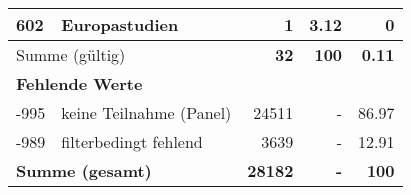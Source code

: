 \begin{longtable}{lXrrr}
     602 &
     \multicolumn{1}{X}{ Europastudien   } &


       \num{1} &
       \num[round-mode=places,round-precision=2]{3.12} &
         \num[round-mode=places,round-precision=2]{0} \\
     \midrule
     \multicolumn{2}{l}{Summe (gültig)} &
       \textbf{\num{32}} &
     \textbf{100} &
       \textbf{\num[round-mode=places,round-precision=2]{0.11}} \\
     \multicolumn{5}{l}{\textbf{Fehlende Werte}}\\
       -995 &
       keine Teilnahme (Panel) &
         \num{24511} &
        - &
         \num[round-mode=places,round-precision=2]{86.97} \\
       -989 &
       filterbedingt fehlend &
         \num{3639} &
        - &
         \num[round-mode=places,round-precision=2]{12.91} \\
     \midrule
     \multicolumn{2}{l}{\textbf{Summe (gesamt)}} &
          \textbf{\num{28182}} &
        \textbf{-} &
        \textbf{100} \\
     \bottomrule
     \end{longtable}
     
